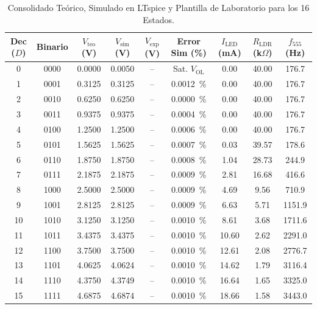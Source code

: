\documentclass[11pt,letterpaper]{article}
\begin{document}
\begin{table}[htbp]
\centering
\caption{Consolidado Teórico, Simulado en LTspice y Plantilla de Laboratorio para los 16 Estados.}
\label{tab:maestro_resultados}
\small
\renewcommand{\arraystretch}{1.12}
\setlength{\tabcolsep}{4.5pt}
\begin{tabular}{ccccccccc}
\toprule
\textbf{Dec ($D$)} & \textbf{Binario} & $V_{\text{teo}}$ \textbf{(V)} & $V_{\text{sim}}$ \textbf{(V)} & $V_{\text{exp}}$ \textbf{(V)} & \textbf{Error Sim (\%)} & $I_{\text{LED}}$ \textbf{(mA)} & $R_{\text{LDR}}$ \textbf{(k$\Omega$)} & $f_{555}$ \textbf{(Hz)} \\
\midrule
0  & 0000 & 0.0000 & 0.0050 & -- & Sat. $V_{\text{OL}}$ & 0.00 & 40.00 & 176.7 \\
1  & 0001 & 0.3125 & 0.3125 & -- & \SI{0.0012}{\percent} & 0.00 & 40.00 & 176.7 \\
2  & 0010 & 0.6250 & 0.6250 & -- & \SI{0.0000}{\percent} & 0.00 & 40.00 & 176.7 \\
3  & 0011 & 0.9375 & 0.9375 & -- & \SI{0.0004}{\percent} & 0.00 & 40.00 & 176.7 \\
4  & 0100 & 1.2500 & 1.2500 & -- & \SI{0.0006}{\percent} & 0.00 & 40.00 & 176.7 \\
5  & 0101 & 1.5625 & 1.5625 & -- & \SI{0.0007}{\percent} & 0.03 & 39.57 & 178.6 \\
6  & 0110 & 1.8750 & 1.8750 & -- & \SI{0.0008}{\percent} & 1.04 & 28.73 & 244.9 \\
7  & 0111 & 2.1875 & 2.1875 & -- & \SI{0.0009}{\percent} & 2.81 & 16.68 & 416.6 \\
8  & 1000 & 2.5000 & 2.5000 & -- & \SI{0.0009}{\percent} & 4.69 &  9.56 & 710.9 \\
9  & 1001 & 2.8125 & 2.8125 & -- & \SI{0.0009}{\percent} & 6.63 &  5.71 & 1151.9 \\
10 & 1010 & 3.1250 & 3.1250 & -- & \SI{0.0010}{\percent} & 8.61 &  3.68 & 1711.6 \\
11 & 1011 & 3.4375 & 3.4375 & -- & \SI{0.0010}{\percent} & 10.60 & 2.62 & 2291.0 \\
12 & 1100 & 3.7500 & 3.7500 & -- & \SI{0.0010}{\percent} & 12.61 & 2.08 & 2776.7 \\
13 & 1101 & 4.0625 & 4.0624 & -- & \SI{0.0010}{\percent} & 14.62 & 1.79 & 3116.4 \\
14 & 1110 & 4.3750 & 4.3749 & -- & \SI{0.0010}{\percent} & 16.64 & 1.65 & 3325.0 \\
15 & 1111 & 4.6875 & 4.6874 & -- & \SI{0.0010}{\percent} & 18.66 & 1.58 & 3443.0 \\
\bottomrule
\end{tabular}
\end{table}
\end{document}
